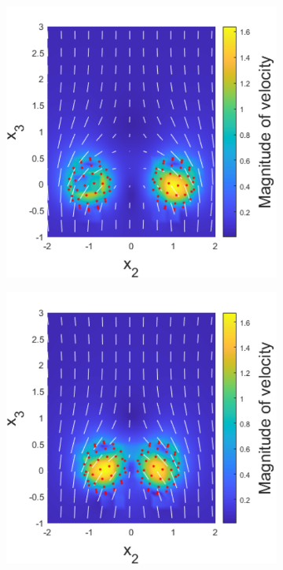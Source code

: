 \begin{figure}
\centering
\begin{subfigure}[b]{0.22\textwidth}
    \centering
    \includegraphics[width=\textwidth]{Images/squirmers/Pair-1.pdf}
    \caption[]{\label{fig:PairA}}
\end{subfigure}
\begin{subfigure}[b]{0.22\textwidth}
    \centering
    \includegraphics[width=\textwidth]{Images/squirmers/Pair-2.pdf}

\end{subfigure}
\end{figure}
